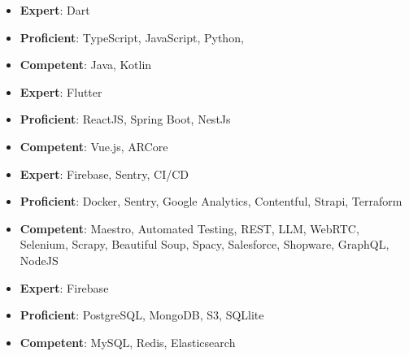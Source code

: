 









{
\quad
\begin{itemize}
\item  \textbf{Expert}: Dart
\item  \textbf{Proficient}: TypeScript, JavaScript, Python, 
\item  \textbf{Competent}: Java, Kotlin
\end{itemize}
}

\vspace{2em}

{
\quad
\begin{itemize}
\item  \textbf{Expert}: Flutter
\item  \textbf{Proficient}: ReactJS, Spring Boot, NestJs
\item  \textbf{Competent}: Vue.js, ARCore
\end{itemize}
}

\vspace{2em}

{
\quad
\begin{itemize}
\item  \textbf{Expert}: Firebase, Sentry, CI/CD
\item  \textbf{Proficient}: Docker, Sentry, Google Analytics, Contentful, Strapi, Terraform
\item  \textbf{Competent}: Maestro, Automated Testing, REST, LLM, WebRTC, Selenium, Scrapy, Beautiful Soup, Spacy, Salesforce, Shopware, GraphQL, NodeJS
\end{itemize}
}

\vspace{2em}

{
\quad
\begin{itemize}
\item  \textbf{Expert}: Firebase
\item  \textbf{Proficient}: PostgreSQL, MongoDB, S3, SQLlite
\item  \textbf{Competent}: MySQL, Redis, Elasticsearch
\end{itemize}
}




